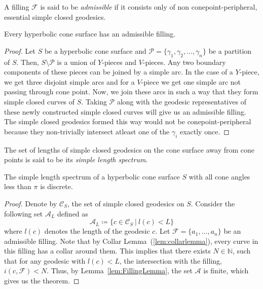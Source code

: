 \begin{defn}
	A filling $\mathcal{F}$ is said to be \textit{admissible} if it consists only of non conepoint-peripheral, essential simple closed geodesics.
\end{defn}

\begin{lem} \label{Admissible Filling:Existence}
	Every hyperbolic cone surface has an admissible filling.
\end{lem}

\begin{proof}
	Let $S$ be a hyperbolic cone surface and $\mathcal{P} = \{\gamma_1, \gamma_2, \ldots, \gamma_n\}$ be a partition of $S$. Then, $S \setminus \mathcal{P}$ is a union of $Y$-pieces and $V$-pieces. Any two boundary components of these pieces can be joined by a simple arc. In the case of a $Y$-piece, we get three disjoint simple arcs and for a $V$-piece we get one simple arc not passing through cone point. Now, we join these arcs in such a way that they form simple closed curves of $S$. Taking $\mathcal{P}$ along with the geodesic representatives of these newly constructed simple closed curves will give us an admissible filling. The simple closed geodesics formed this way would not be conepoint-peripheral because they non-trivially intersect atleast one of the $\gamma_i$ exactly once.
	
\end{proof}

\begin{defn} \label{def:sls}
	The set of lengths of simple closed geodesics on the cone surface away from cone points is said to be its \textit{simple length spectrum}.
\end{defn}

\begin{theorem}\label{thm:discrete_sls}
	The simple length spectrum of a hyperbolic cone surface $S$ with all cone angles less than $\pi$ is discrete.
\end{theorem}

\begin{proof}
	Denote by $\mathcal{C}_S$, the set of simple closed geodesics on $S$.
	Consider the following set $\mathcal{A}_L$ defined as
	$$\mathcal{A}_L \coloneqq \{c \in \mathcal{C}_S ~ |~ l(c) < L \}$$
	where $l(c)$ denotes the length of the geodesic $c$. Let $\mathcal{F} = \{a_1, \ldots, a_n\}$ be an admissible filling. Note that by Collar Lemma~(\ref{lem:collarlemma}), every curve in this filling has a collar around them. This implies that there exists $N \in \mathbb{N}$, such that for any geodesic with $l(c) < L$, the intersection with the filling, $i(c, \mathcal{F}) < N$. Thus, by Lemma~\ref{lem:FillingLemma}, the set $\mathcal{A}$ is finite, which gives us the theorem.	
\end{proof}

